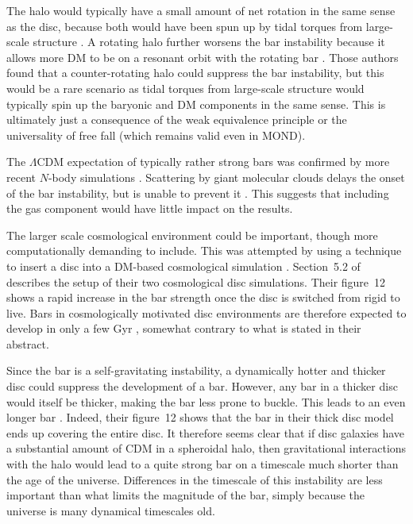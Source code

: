 \documentclass[fleqn,usenatbib,useAMS]{mnras} %
\begin{document}
The halo would typically have a small amount of net rotation in the same sense as the disc, because both would have been spun up by tidal torques from large-scale structure \citep{Doroshkevich_1970, White_1984}. A rotating halo further worsens the bar instability because it allows more DM to be on a resonant orbit with the rotating bar \citep{Saha_2013}. Those authors found that a counter-rotating halo could suppress the bar instability, but this would be a rare scenario as tidal torques from large-scale structure would typically spin up the baryonic and DM components in the same sense. This is ultimately just a consequence of the weak equivalence principle or the universality of free fall (which remains valid even in MOND).

The $\Lambda$CDM expectation of typically rather strong bars was confirmed by more recent $N$-body simulations \citep{Sellwood_2016, Berrier_2016}. Scattering by giant molecular clouds delays the onset of the bar instability, but is unable to prevent it \citep{Aumer_2016}. This suggests that including the gas component would have little impact on the results.

The larger scale cosmological environment could be important, though more computationally demanding to include. This was attempted by \citet{Bauer_2019} using a technique to insert a disc into a DM-based cosmological simulation \citep{Bauer_2018}. Section~5.2 of \citet{Bauer_2019} describes the setup of their two cosmological disc simulations. Their figure~12 shows a rapid increase in the bar strength once the disc is switched from rigid to live. Bars in cosmologically motivated disc environments are therefore expected to develop in only a few Gyr \citep{Bauer_2019}, somewhat contrary to what is stated in their abstract.

Since the bar is a self-gravitating instability, a dynamically hotter and thicker disc could suppress the development of a bar. However, any bar in a thicker disc would itself be thicker, making the bar less prone to buckle. This leads to an even longer bar \citep{Klypin_2009}. Indeed, their figure~12 shows that the bar in their thick disc model ends up covering the entire disc. It therefore seems clear that if disc galaxies have a substantial amount of CDM in a spheroidal halo, then gravitational interactions with the halo would lead to a quite strong bar on a timescale much shorter than the age of the universe. Differences in the timescale of this instability are less important than what limits the magnitude of the bar, simply because the universe is many dynamical timescales old.
\end{document}
